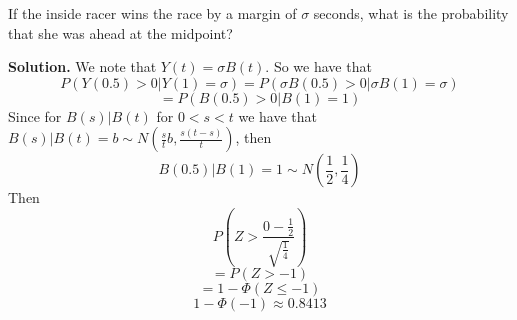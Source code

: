 \documentclass{article}
\newcommand{\bi}{\bigbreak \noindent}
\newcommand{\proof}{\bi \textbf{Solution. }}
\begin{document}
\bi If the inside racer wins the race by a margin of $\sigma$ 
seconds, what is the probability that she was ahead at the 
midpoint? 

\proof We note that $Y(t)=\sigma B(t)$. So we have that 
$$P(Y(0.5)>0 | Y(1)=\sigma) = P(\sigma B(0.5)> 0 | \sigma B(1)=\sigma) $$
$$=P(B(0.5)>0 | B(1)=1)$$
Since for $B(s)|B(t)$ for $0<s<t$ we have that $B(s)|B(t)=b\sim N(\frac{s}{t}b, \frac{s(t-s)}{t})$, 
then 
$$B(0.5)|B(1)=1\sim N(\frac{1}{2}, \frac{1}{4})$$
Then 
$$P(Z>\frac{0-\frac{1}{2}}{\sqrt{\frac{1}{4}}})$$
$$=P(Z>-1)$$
$$=1-\Phi(Z\leq -1)$$
$$1-\Phi(-1)\approx 0.8413$$
\end{document}
